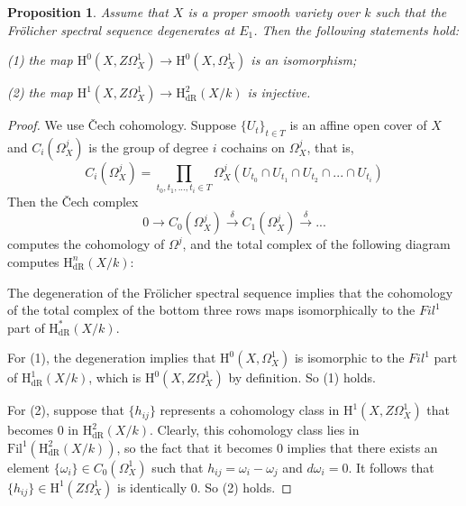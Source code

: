 \documentclass[a4paper,12pt,twoside]{report}
\newtheorem{proposition}[theorem]{Proposition}
\newcommand{\dR}{\mathrm{dR}}
\newcommand{\HH}{\mathrm{H}}
\newcommand{\Fil}{\mathrm{Fil}}
\begin{document}
\begin{proposition}\label{HdRdegene}
    Assume that $X$ is a proper smooth variety over $k$ such that the Fr\"olicher spectral sequence degenerates at $E_1$. Then the following statements hold:
    
{\rm (1)} the map $\HH^0(X,Z\Omega^1_X) \rightarrow \HH^0(X,\Omega_X^1)$ is an isomorphism;

{\rm (2)} the map $\HH^1(X,Z\Omega^1_X) \rightarrow \HH^2_{\dR}(X/k)$ is  injective.
\end{proposition}
\begin{proof}
     We use \v{C}ech cohomology. Suppose $\{U_t\}_{t\in T}$ is an affine open cover of $X$ and 
$C_i(\Omega_X^j)$ is the group of degree $i$ cochains on $\Omega_X^j$, that is, 
\[C_i(\Omega_X^j)=\prod_{t_0,t_1,...,t_i\in T}\Omega_X^j(U_{t_0}\cap U_{t_1}\cap U_{t_2} \cap ... \cap U_{t_i})\]
Then the \v{C}ech complex 
\[0 \rightarrow C_0(\Omega_X^j) \xrightarrow{\delta} C_1(\Omega_X^j) \xrightarrow{\delta} ...\]
computes the cohomology of $\Omega^j$, 
and the total complex of the following diagram computes $\HH^n_{\dR}(X/k)$: 
\begin{center}
\end{center}

The degeneration of the Fr\"olicher spectral sequence implies that
the cohomology 
of the total complex of the bottom three rows maps isomorphically to the $Fil^1$ part of $\HH^*_{\dR}(X/k)$. 

For (1), the degeneration implies that $\HH^0(X,\Omega^1_X)$ is isomorphic to the $Fil^1$ part of $\HH^1_{\dR}(X/k)$, which is $\HH^0(X,Z\Omega_X^1)$ by definition. So (1) holds. 

For (2), suppose that $\{h_{ij}\}$ represents a cohomology class in $\HH^1(X,Z\Omega_X^1)$ that becomes $0$ in $\HH^2_{\dR}(X/k)$. 
Clearly, this cohomology class lies in $\Fil^1(\HH^2_{\dR}(X/k))$, so the fact that
it becomes $0$ implies that 
there exists an element $\{\omega_i\}\in C_0(\Omega_X^1)$
such that $h_{ij}=\omega_i-\omega_j$ and $d\omega_i=0$.
It follows that $\{h_{ij}\}\in \HH^1(Z\Omega_X^1)$ is identically $0$. So (2) holds.
\end{proof}
\end{document}
